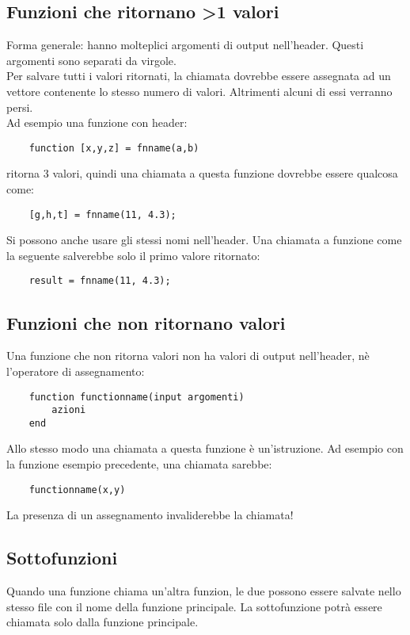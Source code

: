 \documentclass[a4paper, 10pt]{article}
\begin{document}
\subsection{Funzioni che ritornano >1 valori}
Forma generale: hanno molteplici argomenti di output nell'header. Questi argomenti sono separati da virgole. \\
Per salvare tutti i valori ritornati, la chiamata dovrebbe essere assegnata ad un vettore contenente lo stesso numero di valori.
Altrimenti alcuni di essi verranno persi.\\
Ad esempio una funzione con header:
\begin{lstlisting}
	function [x,y,z] = fnname(a,b)
\end{lstlisting}
ritorna 3 valori, quindi una chiamata a questa funzione dovrebbe essere qualcosa come:
\begin{lstlisting}
	[g,h,t] = fnname(11, 4.3);
\end{lstlisting}
Si possono anche usare gli stessi nomi nell'header.
Una chiamata a funzione come la seguente salverebbe solo il primo valore ritornato:
\begin{lstlisting}
	result = fnname(11, 4.3);
\end{lstlisting}

\subsection{Funzioni che non ritornano valori}
Una funzione che non ritorna valori non ha valori di output nell'header, nè l'operatore di assegnamento:

\begin{lstlisting}
	function functionname(input argomenti)
		azioni
	end
\end{lstlisting}
Allo stesso modo una chiamata a questa funzione è un'istruzione. Ad esempio con la funzione esempio precedente, una chiamata sarebbe:
\begin{lstlisting}
	functionname(x,y)
\end{lstlisting}
La presenza di un assegnamento invaliderebbe la chiamata!

\subsection{Sottofunzioni}
Quando una funzione chiama un'altra funzion, le due possono essere salvate nello stesso file con il nome della funzione principale. La sottofunzione potrà essere chiamata solo dalla funzione principale.
\end{document}
